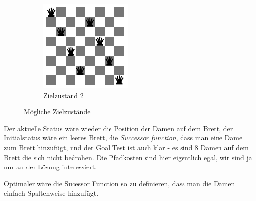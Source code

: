 \begin{figure}[h!]
\begin{subfigure}[h]{0.2\textwidth}
	\includegraphics[width=\textwidth]{fig/8_queens_start}
		\caption{Zielzustand 2}
	\end{subfigure}
	\caption{Mögliche Zielzustände}
	\label{fig:send-receive-message}
\end{figure} 

Der aktuelle Status wäre wieder die Position der Damen auf dem Brett, der Initialstatus wäre ein leeres Brett, die \textit{Successor function}, dass man eine Dame zum Brett hinzufügt, und der Goal Test ist auch klar - es sind 8 Damen auf dem Brett die sich nicht bedrohen. Die Pfadkosten sind hier eigentlich egal, wir sind ja nur an der Lösung interessiert.

Optimaler wäre die Sucessor Function so zu definieren, dass man die Damen einfach Spaltenweise hinzufügt.

